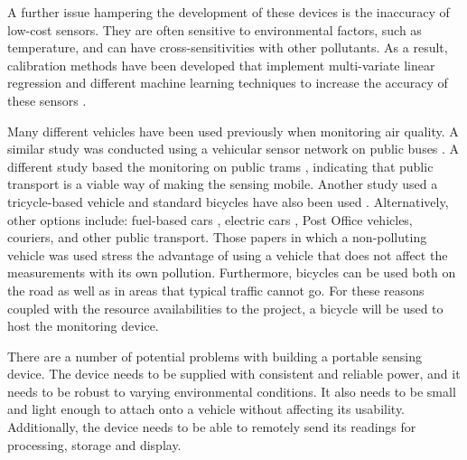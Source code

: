 \documentclass[11pt]{report}
\begin{document}
A further issue hampering the development of these devices is the inaccuracy of low-cost sensors. They are often sensitive to environmental factors, such as temperature, and can have cross-sensitivities with other pollutants. As a result, calibration methods have been developed that implement multi-variate linear regression and different machine learning techniques to increase the accuracy of these sensors \citep{Spinelle2015fieldcalibrationa,Spinelle2017fieldcalibrationb,zimmerman2018machinelearning}.

Many different vehicles have been used previously when monitoring air quality. A similar study was conducted using a vehicular sensor network on public buses \citep{2014busairqualityVSN}. A different study based the monitoring on public trams \citep{Hagemann2014aerotram}, indicating that public transport is a viable way of making the sensing mobile. Another study used a tricycle-based vehicle \citep{Jabbar2017bikefossarchitecture} and standard bicycles have also been used \citep{Elen2013aeroflex,Peters2013cycleruns}. Alternatively, other options include: fuel-based cars \citep{Apte2017googlestreetview,Devarakonda2013}, electric cars \citep{Hagler2010durhamallelectric}, Post Office vehicles, couriers, and other public transport. Those papers in which a non-polluting vehicle was used stress the advantage of using a vehicle that does not affect the measurements with its own pollution. Furthermore, bicycles can be used both on the road as well as in areas that typical traffic cannot go. For these reasons coupled with the resource availabilities to the project, a bicycle will be used to host the monitoring device.

There are a number of potential problems with building a portable sensing device. The device needs to be supplied with consistent and reliable power, and it needs to be robust to varying environmental conditions. It also needs to be small and light enough to attach onto a vehicle without affecting its usability. Additionally, the device needs to be able to remotely send its readings for processing, storage and display.
\end{document}
